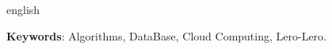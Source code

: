 \setlength{\absparsep}{18pt} %
\begin{resumo}[Abstract]
 \begin{otherlanguage*}{english}
   

   \textbf{Keywords}: Algorithms, DataBase, Cloud Computing, Lero-Lero.
 \end{otherlanguage*}
\end{resumo}